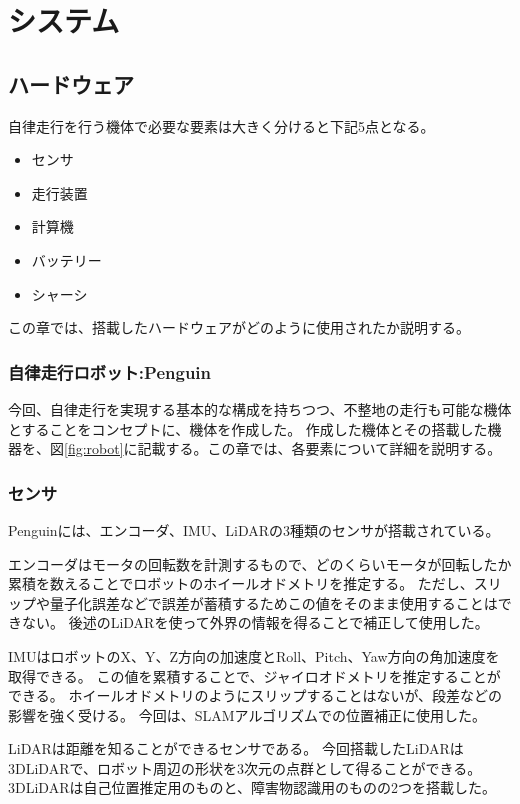 \section{システム}


\subsection{ハードウェア}
自律走行を行う機体で必要な要素は大きく分けると下記5点となる。

\begin{itemize}
    \item センサ
    \item 走行装置
    \item 計算機
    \item バッテリー
    \item シャーシ
\end{itemize}

この章では、搭載したハードウェアがどのように使用されたか説明する。

\subsubsection{自律走行ロボット:Penguin}
今回、自律走行を実現する基本的な構成を持ちつつ、不整地の走行も可能な機体とすることをコンセプトに、機体を作成した。 
作成した機体とその搭載した機器を、図\ref{fig:robot}に記載する。この章では、各要素について詳細を説明する。

\subsubsection{センサ}
Penguinには、エンコーダ、IMU、LiDARの3種類のセンサが搭載されている。

エンコーダはモータの回転数を計測するもので、どのくらいモータが回転したか累積を数えることでロボットのホイールオドメトリを推定する。
ただし、スリップや量子化誤差などで誤差が蓄積するためこの値をそのまま使用することはできない。
後述のLiDARを使って外界の情報を得ることで補正して使用した。

IMUはロボットのX、Y、Z方向の加速度とRoll、Pitch、Yaw方向の角加速度を取得できる。
この値を累積することで、ジャイロオドメトリを推定することができる。
ホイールオドメトリのようにスリップすることはないが、段差などの影響を強く受ける。
今回は、SLAMアルゴリズムでの位置補正に使用した。

LiDARは距離を知ることができるセンサである。
今回搭載したLiDARは3DLiDARで、ロボット周辺の形状を3次元の点群として得ることができる。
3DLiDARは自己位置推定用のものと、障害物認識用のものの2つを搭載した。

